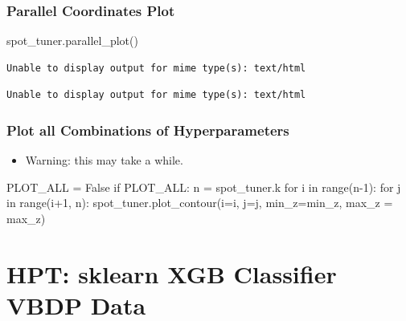 \documentclass[
  letterpaper,
  DIV=11,
  numbers=noendperiod]{scrreprt}
\newenvironment{Shaded}{\begin{snugshade}}{\end{snugshade}}
\newcommand{\BuiltInTok}[1]{\textcolor[rgb]{0.00,0.23,0.31}{#1}}
\newcommand{\ControlFlowTok}[1]{\textcolor[rgb]{0.00,0.23,0.31}{#1}}
\newcommand{\DecValTok}[1]{\textcolor[rgb]{0.68,0.00,0.00}{#1}}
\newcommand{\KeywordTok}[1]{\textcolor[rgb]{0.00,0.23,0.31}{#1}}
\newcommand{\NormalTok}[1]{\textcolor[rgb]{0.00,0.23,0.31}{#1}}
\newcommand{\OperatorTok}[1]{\textcolor[rgb]{0.37,0.37,0.37}{#1}}
\newcommand{\VariableTok}[1]{\textcolor[rgb]{0.07,0.07,0.07}{#1}}
\providecommand{\tightlist}{%
  \setlength{\itemsep}{0pt}\setlength{\parskip}{0pt}}\usepackage{longtable,booktabs,array}
\begin{document}
\hypertarget{parallel-coordinates-plot-1}{%
\subsection{Parallel Coordinates
Plot}\label{parallel-coordinates-plot-1}}

\begin{Shaded}
\begin{Highlighting}[]
\NormalTok{spot\_tuner.parallel\_plot()}
\end{Highlighting}
\end{Shaded}

\begin{verbatim}
Unable to display output for mime type(s): text/html
\end{verbatim}

\begin{verbatim}
Unable to display output for mime type(s): text/html
\end{verbatim}

\hypertarget{plot-all-combinations-of-hyperparameters-1}{%
\subsection{Plot all Combinations of
Hyperparameters}\label{plot-all-combinations-of-hyperparameters-1}}

\begin{itemize}
\tightlist
\item
  Warning: this may take a while.
\end{itemize}

\begin{Shaded}
\begin{Highlighting}[]
\NormalTok{PLOT\_ALL }\OperatorTok{=} \VariableTok{False}
\ControlFlowTok{if}\NormalTok{ PLOT\_ALL:}
\NormalTok{    n }\OperatorTok{=}\NormalTok{ spot\_tuner.k}
    \ControlFlowTok{for}\NormalTok{ i }\KeywordTok{in} \BuiltInTok{range}\NormalTok{(n}\OperatorTok{{-}}\DecValTok{1}\NormalTok{):}
        \ControlFlowTok{for}\NormalTok{ j }\KeywordTok{in} \BuiltInTok{range}\NormalTok{(i}\OperatorTok{+}\DecValTok{1}\NormalTok{, n):}
\NormalTok{            spot\_tuner.plot\_contour(i}\OperatorTok{=}\NormalTok{i, j}\OperatorTok{=}\NormalTok{j, min\_z}\OperatorTok{=}\NormalTok{min\_z, max\_z }\OperatorTok{=}\NormalTok{ max\_z)}
\end{Highlighting}
\end{Shaded}

\hypertarget{sec-hpt-sklearn-xgb-classifier-vbdp-data}{%
\chapter{HPT: sklearn XGB Classifier VBDP
Data}\label{sec-hpt-sklearn-xgb-classifier-vbdp-data}}
\end{document}
